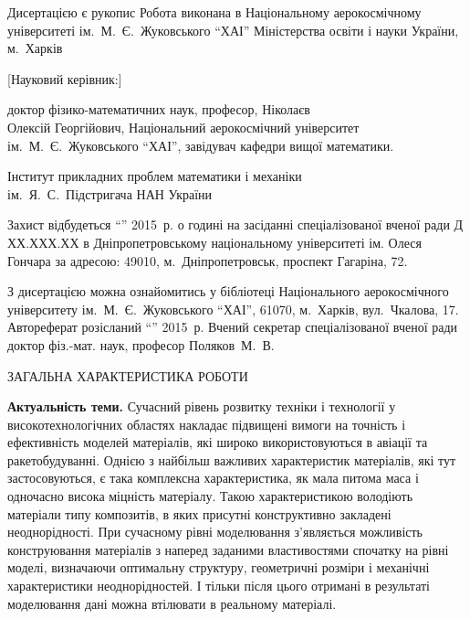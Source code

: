 \documentclass[book,14pt,small,oneside]{ncc}
\begin{document}
\begin{titlepage}
\noindent Дисертацією є рукопис
\vskip1cm
\noindent Робота виконана в Національному аерокосмічному університеті ім.~М.~Є.~Жуковського ``ХАІ'' Міністерства освіти і науки України, м.~Харків
\vskip1cm
\begin{desclist}{}{}[Науковий керівник:]
\item[Науковий керівник:] доктор фізико-математичних наук, професор, Ні\-ко\-ла\-єв \\ Оле\-к\-сій Георгійович, Національний аерокосмічний університет ім.~М.~Є.~Жуковського ``ХАІ'', завідувач кафедри вищої математики.
\item[Офіційні опоненти:] 
\item[Провідна установа:] Інститут прикладних проблем математики і механіки \\ ім.~Я.~С.~Підстригача НАН України
\end{desclist}
\vskip2cm
Захист відбудеться ``\underline{\hspace{1cm}}'' \underline{\hspace{3cm}} 2015~р. о \underline{\hspace{1cm}} годині на засіданні спеціалізованої вченої ради Д ХХ.ХХХ.ХХ в Дніпропетровському національному університеті ім. Олеся Гончара за адресою: 49010, м.~Дніпропетровськ, проспект Гагаріна, 72.

З дисертацією можна ознайомитись у бібліотеці Національного аерокосмічного університету ім.~М.~Є.~Жуковського ``ХАІ'', 61070, м.~Харків, вул.~Чкалова, 17.
\vskip2cm
Автореферат розісланий ``\underline{\hspace{1cm}}''\underline{\hspace{3cm}} 2015~р.
\vskip2cm
\noindent Вчений секретар спеціалізованої вченої ради \\
доктор фіз.-мат. наук, професор \hfill Поляков~М.~В.
\end{titlepage}

\begin{center}
ЗАГАЛЬНА ХАРАКТЕРИСТИКА РОБОТИ
\end{center}
{\bf Актуальність теми.} Сучасний рівень розвитку техніки і технології у високотехнологічних областях накладає підвищені вимоги на точність і ефективність моделей матеріалів, які широко використовуються в авіації та ракетобудуванні. Однією з найбільш важливих характеристик матеріалів, які тут застосовуються, є така комплексна характеристика, як мала питома маса і одночасно висока міцність матеріалу. Такою характеристикою володіють матеріали типу композитів, в яких присутні конструктивно закладені неоднорідності. При сучасному рівні моделювання з'являється можливість конструювання матеріалів з наперед заданими властивостями спочатку на рівні моделі, визначаючи оптимальну структуру, геометричні розміри і механічні характеристики неоднорідностей. І тільки після цього отримані в результаті моделювання дані можна втілювати в реальному матеріалі.
\end{document}
